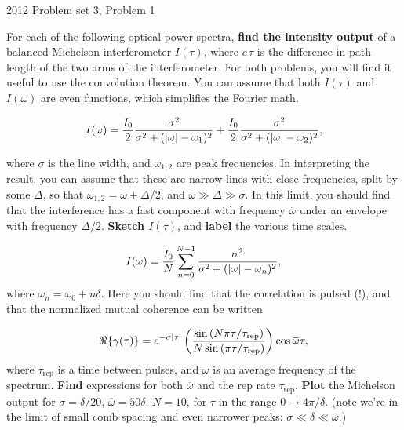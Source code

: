 {2012 Problem set 3, Problem 1}
{
For each of the following optical power spectra, {\bf find the intensity output} of a balanced Michelson interferometer $I(\tau)$, where $c \,\tau$ is the difference in path length of the two arms of the interferometer. For both problems, you will find it useful to use the convolution theorem. You can assume that both $I(\tau)$ and $I(\omega)$ are even functions, which simplifies the Fourier math.

\begin{dmath}\label{eqn:modernOptics:problemSet3:1:20}
I(\omega)
= \frac{I_0}{2} \frac{\sigma^2}{\sigma^2 + (\Abs{\omega} - \omega_1)^2}  +
\frac{I_0}{2} \frac{\sigma^2}{\sigma^2 + (\Abs{\omega} - \omega_2)^2},
\end{dmath}

where $\sigma$ is the line width, and $\omega_{1,2}$ are peak frequencies. In interpreting the result, you can assume that these are narrow lines with close frequencies, split by some $\Delta$, so that $\omega_{1,2} = \overbar{\omega} \pm \Delta/2$, and $\overbar{\omega} \gg \Delta \gg \sigma$. In this limit, you should find that the interference has a fast component with frequency $\overbar{\omega}$ under an envelope with frequency $\Delta/2$. {\bf Sketch $I(\tau)$}, and {\bf label} the various time scales.

\begin{dmath}\label{eqn:modernOptics:problemSet3:1:40}
I(\omega) = \frac{I_0}{N} \sum_{n=0}^{N-1} \frac{\sigma^2}{\sigma^2 + (\Abs{\omega} - \omega_n)^2},
\end{dmath}
where $\omega_n = \omega_0 + n \delta$. Here you should find that the correlation is pulsed (!), and that the normalized mutual coherence  can be written

\begin{dmath}\label{eqn:modernOptics:problemSet3:1:60}
\Re\{\gamma(\tau)\}
= e^{-\sigma \Abs{\tau}}
\left(
\frac{
   \sin\left( N \pi \tau/\tau_{\mathrm{rep}} \right)
}
{
   N \sin\left( \pi \tau/\tau_{\mathrm{rep}} \right)
}
\right)
\cos \overbar{\omega} \tau,
\end{dmath}
where $\tau_{\mathrm{rep}}$ is a time between pulses, and $\overbar{\omega}$ is an average frequency of the spectrum. {\bf Find} expressions for both $\overbar{\omega}$ and the rep rate $\tau_{\mathrm{rep}}$.
{\bf Plot} the Michelson output for $\sigma = \delta/20$, $\overbar{\omega} = 50 \delta$, $N=10$, for $\tau$ in the range $0 \rightarrow 4 \pi / \delta$. (note we're in the limit of small comb spacing and even narrower peaks: $\sigma \ll \delta \ll \overbar{\omega}$.)
}
